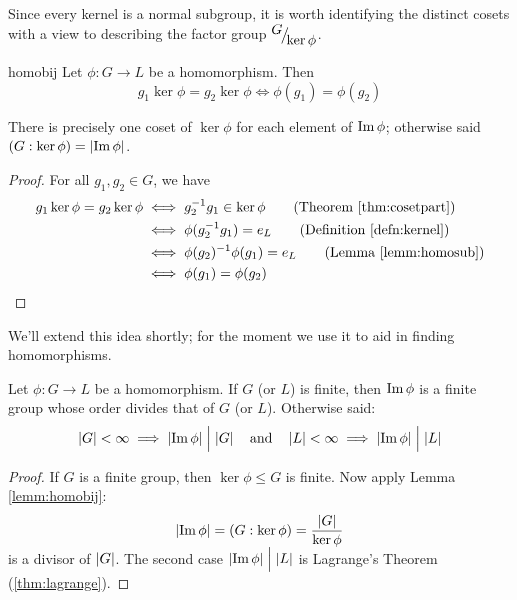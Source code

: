 Since every kernel is a normal subgroup, it is worth identifying the distinct cosets with a view to describing the factor group ${}^{\textstyle {G}}\!\big/_{\textstyle \!{\ker\phi}}$.

\begin{lemm}{}{homobij}
Let $\phi:G\to L$ be a homomorphism. Then
\[g_1\ker\phi=g_2\ker\phi\iff \phi(g_1)=\phi(g_2)\]
\end{lemm}

There is precisely one coset of $\ker\phi$ for each element of $\operatorname{Im}\phi$; otherwise said $(G:\ker\phi)=\left| \operatorname{Im}\phi\right|$.

\begin{proof}
For all $g_1,g_2\in G$, we have
\begin{align*}
g_1\ker\phi=g_2\ker\phi&\iff g_2^{-1}g_1\in\ker\phi \tag{Theorem \ref{thm:cosetpart}}\\
&\iff\phi(g_2^{-1}g_1)=e_L\tag{Definition \ref{defn:kernel}}\\
&\iff \phi(g_2)^{-1}\phi(g_1)=e_L\tag{Lemma \ref{lemm:homosub}}\\
&\iff \phi(g_1)=\phi(g_2)\tag*{\qedhere}
\end{align*}
\end{proof}

We'll extend this idea shortly; for the moment we use it to aid in finding homomorphisms.

\begin{thm}{}{}
Let $\phi:G\to L$ be a homomorphism. If $G$ (or $L$) is finite, then $\operatorname{Im}\phi$ is a finite group whose order divides that of $G$ (or $L$). Otherwise said:
\[\left| G\right|<\infty\implies\left| \operatorname{Im}\phi\right|\Bigm| \left| G\right|\quad\text{and}\quad \left| L\right|<\infty\implies\left| \operatorname{Im}\phi\right|\Bigm| \left| L\right|\]
\end{thm}

\begin{proof}
If $G$ is a finite group, then $\ker\phi\le G$ is finite. Now apply Lemma \ref{lemm:homobij}:
\[\left| \operatorname{Im}\phi\right|=(G:\ker\phi) =\smash[b]{\frac{\left| G\right|}{\ker\phi}}\]
is a divisor of $\left| G\right|$. The second case $\left| \operatorname{Im}\phi\right|\Bigm|\left| L\right|$ is Lagrange's Theorem (\ref{thm:lagrange}).
\end{proof}

